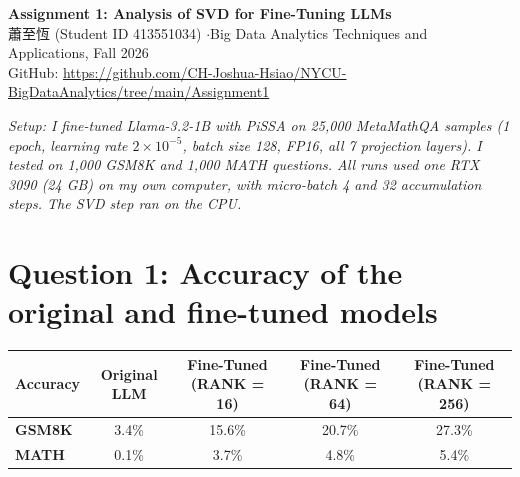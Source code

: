 \documentclass[10pt,a4paper]{article}
\newcommand{\cjkname}[1]{#1}
\newcommand{\cjkname}[1]{\begin{CJK}{UTF8}{bkai}#1\end{CJK}}
\begin{document}
\begin{center}
  {\Large\bfseries Assignment 1: Analysis of SVD for Fine-Tuning LLMs}\\[2pt]
  \cjkname{蕭至恆} (Student ID 413551034) \quad$\cdot$\quad Big Data Analytics Techniques and Applications, Fall 2026\\
  GitHub: \url{https://github.com/CH-Joshua-Hsiao/NYCU-BigDataAnalytics/tree/main/Assignment1}
\end{center}
\vspace{-4pt}
{\small\itshape Setup: I fine-tuned Llama-3.2-1B with PiSSA on 25,000 MetaMathQA samples (1 epoch, learning rate
$2\times10^{-5}$, batch size 128, FP16, all 7 projection layers). I tested on 1,000 GSM8K and 1,000 MATH questions.
All runs used one RTX 3090 (24 GB) on my own computer, with micro-batch 4 and 32 accumulation steps. The SVD step
ran on the CPU.\par}

\section*{Question 1: Accuracy of the original and fine-tuned models}
\begin{center}\small
\begin{tabularx}{\textwidth}{l C C C C}
  \toprule
  \textbf{Accuracy} & \textbf{Original LLM} & \textbf{Fine-Tuned (RANK = 16)} & \textbf{Fine-Tuned (RANK = 64)} & \textbf{Fine-Tuned (RANK = 256)} \\
  \midrule
  \textbf{GSM8K} & 3.4\% & 15.6\% & 20.7\% & 27.3\% \\
  \textbf{MATH}  & 0.1\% & 3.7\%  & 4.8\%  & 5.4\%  \\
  \bottomrule
\end{tabularx}
\end{center}
\end{document}
